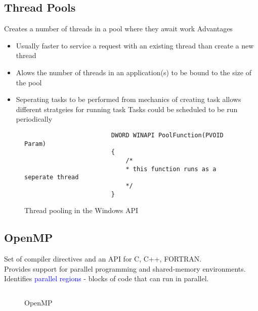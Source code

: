 \documentclass{book}
\begin{document}
            \subsection{Thread Pools}
                Creates a number of threads in a pool where they await work
                Advantages
                \begin{itemize}
                    \item Usually faster to service a request with an existing thread than create a new thread
                    \item Alows the number of threads in an application(s) to be bound to the size of the pool
                    \item Seperating tasks to be performed from mechanics of creating task allows different stratgeies for
                    running task
                        \subitem Tasks could be scheduled to be run periodically
                \end{itemize}
                \begin{figure}[H]
                    \centering
                    \begin{verbatim}
                        DWORD WINAPI PoolFunction(PVOID Param)
                        {
                            /*
                            * this function runs as a seperate thread
                            */
                        }
                    \end{verbatim}
                    \caption{Thread pooling in the Windows API}
                \end{figure}
            \subsection*{OpenMP}
                Set of compiler directives and an API for C, C++, FORTRAN.\\
                Provides support for parallel programming and shared-memory environments.\\
                Identifies \textcolor{blue}{parallel regions} - blocks of code that can run in parallel.\\
                \begin{figure}[H]
                    \centering
                    \inputminted{c}{code/threads/openmp.c}
                    \caption{OpenMP}
                \end{figure}
\end{document}
